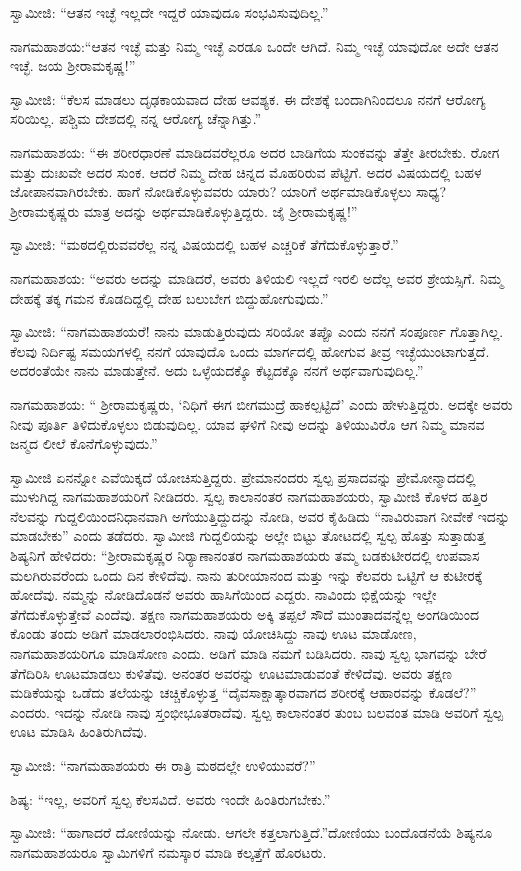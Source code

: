  ಸ್ವಾಮೀಜಿ: “ಆತನ ಇಚ್ಛೆ ಇಲ್ಲದೇ ಇದ್ದರೆ ಯಾವುದೂ ಸಂಭವಿಸುವುದಿಲ್ಲ.” 

 ನಾಗಮಹಾಶಯ:‌“ಆತನ ಇಚ್ಛೆ ಮತ್ತು ನಿಮ್ಮ ಇಚ್ಛೆ ಎರಡೂ ಒಂದೇ ಆಗಿದೆ. ನಿಮ್ಮ ಇಚ್ಛೆ ಯಾವುದೋ ಅದೇ ಆತನ ಇಚ್ಛೆ. ಜಯ ಶ‍್ರೀರಾಮಕೃಷ್ಣ!” 

 ಸ್ವಾಮೀಜಿ: “ಕೆಲಸ ಮಾಡಲು ದೃಢಕಾಯವಾದ ದೇಹ ಆವಶ್ಯಕ. ಈ ದೇಶಕ್ಕೆ ಬಂದಾಗಿನಿಂದಲೂ ನನಗೆ ಆರೋಗ್ಯ ಸರಿಯಿಲ್ಲ. ಪಶ್ಚಿಮ ದೇಶದಲ್ಲಿ ನನ್ನ ಆರೋಗ್ಯ ಚೆನ್ನಾಗಿತ್ತು.” 

 ನಾಗಮಹಾಶಯ: “ಈ ಶರೀರಧಾರಣೆ ಮಾಡಿದವರೆಲ್ಲರೂ ಅದರ ಬಾಡಿಗೆಯ ಸುಂಕವನ್ನು ತೆತ್ತೇ ತೀರಬೇಕು. ರೋಗ ಮತ್ತು ದುಃಖವೇ ಅದರ ಸುಂಕ. ಆದರೆ ನಿಮ್ಮ ದೇಹ ಚಿನ್ನದ ಮೊಹರಿರುವ ಪೆಟ್ಟಿಗೆ. ಅದರ ವಿಷಯದಲ್ಲಿ ಬಹಳ ಜೋಪಾನವಾಗಿರಬೇಕು. ಹಾಗೆ ನೋಡಿಕೊಳ್ಳುವವರು ಯಾರು? ಯಾರಿಗೆ ಅರ್ಥಮಾಡಿಕೊಳ್ಳಲು ಸಾಧ್ಯ? ಶ‍್ರೀರಾಮಕೃಷ್ಣರು ಮಾತ್ರ ಅದನ್ನು ಅರ್ಥಮಾಡಿಕೊಳ್ಳುತ್ತಿದ್ದರು. ಜೈ ಶ‍್ರೀರಾಮಕೃಷ್ಣ!” 

 ಸ್ವಾಮೀಜಿ: “ಮಠದಲ್ಲಿರುವವರೆಲ್ಲ ನನ್ನ ವಿಷಯದಲ್ಲಿ ಬಹಳ ಎಚ್ಚರಿಕೆ ತೆಗೆದುಕೊಳ್ಳುತ್ತಾರೆ.” 

 ನಾಗಮಹಾಶಯ: “ಅವರು ಅದನ್ನು ಮಾಡಿದರೆ, ಅವರು ತಿಳಿಯಲಿ ಇಲ್ಲದೆ ಇರಲಿ ಅದೆಲ್ಲ ಅವರ ಶ್ರೇಯಸ್ಸಿಗೆ. ನಿಮ್ಮ ದೇಹಕ್ಕೆ ತಕ್ಕ ಗಮನ ಕೊಡದಿದ್ದಲ್ಲಿ ದೇಹ ಬಲುಬೇಗ ಬಿದ್ದುಹೋಗುವುದು.” 

 ಸ್ವಾಮೀಜಿ: “ನಾಗಮಹಾಶಯರೆ! ನಾನು ಮಾಡುತ್ತಿರುವುದು ಸರಿಯೋ ತಪ್ಪೊ ಎಂದು ನನಗೆ ಸಂಪೂರ್ಣ ಗೊತ್ತಾಗಿಲ್ಲ. ಕೆಲವು ನಿರ್ದಿಷ್ಟ ಸಮಯಗಳಲ್ಲಿ ನನಗೆ ಯಾವುದೊ ಒಂದು ಮಾರ್ಗದಲ್ಲಿ ಹೋಗುವ ತೀವ್ರ ಇಚ್ಛೆಯುಂಟಾಗುತ್ತದೆ. ಅದರಂತೆಯೇ ನಾನು ಮಾಡುತ್ತೇನೆ. ಅದು ಒಳ್ಳೆಯದಕ್ಕೊ ಕೆಟ್ಟದಕ್ಕೊ ನನಗೆ ಅರ್ಥವಾಗುವುದಿಲ್ಲ.” 

 ನಾಗಮಹಾಶಯ: “ ಶ‍್ರೀರಾಮಕೃಷ್ಣರು, ‘ನಿಧಿಗೆ ಈಗ ಬೀಗಮುದ್ರೆ ಹಾಕಲ್ಪಟ್ಟಿದೆ’ ಎಂದು ಹೇಳುತ್ತಿದ್ದರು. ಅದಕ್ಕೇ ಅವರು ನೀವು ಪೂರ್ತಿ ತಿಳಿದುಕೊಳ್ಳಲು ಬಿಡುವುದಿಲ್ಲ. ಯಾವ ಘಳಿಗೆ ನೀವು ಅದನ್ನು ತಿಳಿಯುವಿರೊ ಆಗ ನಿಮ್ಮ ಮಾನವ ಜನ್ಮದ ಲೀಲೆ ಕೊನೆಗೊಳ್ಳುವುದು.” 

 ಸ್ವಾಮೀಜಿ ಏನನ್ನೋ ಎವೆಯಿಕ್ಕದೆ ಯೋಚಿಸುತ್ತಿದ್ದರು. ಪ್ರೇಮಾನಂದರು ಸ್ವಲ್ಪ ಪ್ರಸಾದವನ್ನು ಪ್ರೇಮೋನ್ಮಾದದಲ್ಲಿ ಮುಳುಗಿದ್ದ ನಾಗಮಹಾಶಯರಿಗೆ ನೀಡಿದರು. ಸ್ವಲ್ಪ ಕಾಲಾನಂತರ ನಾಗಮಹಾಶಯರು, ಸ್ವಾಮೀಜಿ ಕೊಳದ ಹತ್ತಿರ ನೆಲವನ್ನು ಗುದ್ದಲಿಯಿಂದ\break ನಿಧಾನವಾಗಿ ಅಗೆಯುತ್ತಿದ್ದುದನ್ನು ನೋಡಿ, ಅವರ ಕೈಹಿಡಿದು “ನಾವಿರುವಾಗ ನೀವೇಕೆ ಇದನ್ನು ಮಾಡಬೇಕು” ಎಂದು ತಡೆದರು. ಸ್ವಾಮೀಜಿ ಗುದ್ದಲಿಯನ್ನು ಅಲ್ಲೇ ಬಿಟ್ಟು ತೋಟದಲ್ಲಿ ಸ್ವಲ್ಪ ಹೊತ್ತು ಸುತ್ತಾಡುತ್ತ ಶಿಷ್ಯನಿಗೆ ಹೇಳಿದರು: “ಶ‍್ರೀರಾಮಕೃಷ್ಣರ ನಿರ‍್ಯಾಣಾನಂತರ ನಾಗಮಹಾಶಯರು ತಮ್ಮ ಬಡಕುಟೀರದಲ್ಲಿ ಉಪವಾಸ ಮಲಗಿರುವರೆಂದು ಒಂದು ದಿನ ಕೇಳಿದೆವು. ನಾನು ತುರೀಯಾನಂದ ಮತ್ತು ಇನ್ನು ಕೆಲವರು ಒಟ್ಟಿಗೆ ಆ‌ ಕುಟೀರಕ್ಕೆ ಹೋದೆವು. ನಮ್ಮನ್ನು ನೋಡಿದೊಡನೆ ಅವರು ಹಾಸಿಗೆಯಿಂದ ಎದ್ದರು. ನಾವಿಂದು ಭಿಕ್ಷೆಯನ್ನು ಇಲ್ಲೇ ತೆಗೆದುಕೊಳ್ಳುತ್ತೇವೆ ಎಂದೆವು. ತಕ್ಷಣ ನಾಗಮಹಾಶಯರು ಅಕ್ಕಿ ತಪ್ಪಲೆ ಸೌದೆ ಮುಂತಾದವನ್ನೆಲ್ಲ ಅಂಗಡಿಯಿಂದ ಕೊಂಡು ತಂದು ಅಡಿಗೆ ಮಾಡಲಾರಂಭಿಸಿದರು. ನಾವು ಯೋಚಿಸಿದ್ದು ನಾವು ಊಟ ಮಾಡೋಣ, ನಾಗಮಹಾಶಯರಿಗೂ ಮಾಡಿಸೋಣ ಎಂದು. ಅಡಿಗೆ ಮಾಡಿ ನಮಗೆ ಬಡಿಸಿದರು. ನಾವು ಸ್ವಲ್ಪ ಭಾಗವನ್ನು ಬೇರೆ ತೆಗೆದಿರಿಸಿ ಊಟಮಾಡಲು ಕುಳಿತೆವು. ಅನಂತರ ಅವರನ್ನು ಊಟಮಾಡುವಂತೆ ಕೇಳಿದೆವು. ಅವರು ತಕ್ಷಣ ಮಡಿಕೆಯನ್ನು ಒಡೆದು ತಲೆಯನ್ನು ಚಚ್ಚಿಕೊಳ್ಳುತ್ತ “ದೈವಸಾಕ್ಷಾತ್ಕಾರವಾಗದ ಶರೀರಕ್ಕೆ ಆಹಾರವನ್ನು ಕೊಡಲೆ?” ಎಂದರು. ಇದನ್ನು ನೋಡಿ ನಾವು ಸ್ತಂಭೀಭೂತರಾದೆವು. ಸ್ವಲ್ಪ ಕಾಲಾನಂತರ ತುಂಬ ಬಲವಂತ ಮಾಡಿ ಅವರಿಗೆ ಸ್ವಲ್ಪ ಊಟ ಮಾಡಿಸಿ ಹಿಂತಿರುಗಿದೆವು. 

 ಸ್ವಾಮೀಜಿ: “ನಾಗಮಹಾಶಯರು ಈ ರಾತ್ರಿ ಮಠದಲ್ಲೇ ಉಳಿಯುವರೆ?” 

 ಶಿಷ್ಯ: “ಇಲ್ಲ, ಅವರಿಗೆ ಸ್ವಲ್ಪ ಕೆಲಸವಿದೆ. ಅವರು ಇಂದೇ ಹಿಂತಿರುಗಬೇಕು.” 

 ಸ್ವಾಮೀಜಿ: “ಹಾಗಾದರೆ ದೋಣಿಯನ್ನು ನೋಡು. ಆಗಲೇ ಕತ್ತಲಾಗುತ್ತಿದೆ.”\break ದೋಣಿಯು ಬಂದೊಡನೆಯೆ ಶಿಷ್ಯನೂ ನಾಗಮಹಾಶಯರೂ ಸ್ವಾಮಿಗಳಿಗೆ ನಮಸ್ಕಾರ ಮಾಡಿ ಕಲ್ಕತ್ತೆಗೆ ಹೊರಟರು. 

